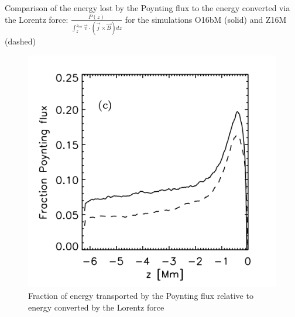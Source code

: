\documentclass{beamer}
\begin{document}
\begin{frame}{Comparison of the energy lost by the Poynting flux to the
energy converted via the Lorentz force:  $\frac{P(z)}{\int_z^{z_{top}}{ \vec{v} \cdot \left( \vec{j} \times \vec{B} \right)dz }}$ for the simulations O16bM (solid) and Z16M (dashed)}

\begin{figure}[H]
 \centering
 \includegraphics[scale=0.3]{poynting3.png}
	\caption{Fraction of energy transported by the Poynting flux relative to energy converted by the Lorentz
force}
\end{figure}

\end{frame}
\end{document}
